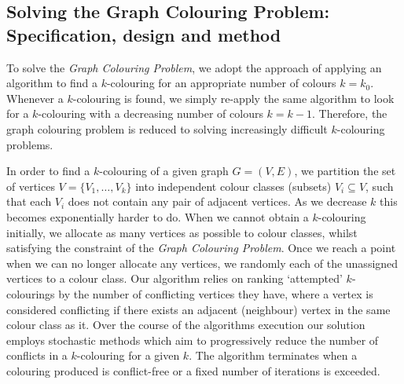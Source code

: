 \documentclass[12pt,a4paper]{article}
\begin{document}
\subsection*{Solving the Graph Colouring Problem: Specification, design and method}
\par To solve the \textit{Graph Colouring Problem}, we adopt the approach of applying an algorithm to find a $k$-colouring for an appropriate number of colours $k = k_0$. Whenever a $k$-colouring is found, we simply re-apply the same algorithm to look for a $k$-colouring with a decreasing number of colours $k=k-1$. Therefore, the graph colouring problem is reduced to solving increasingly difficult $k$-colouring problems.
\par In order to find a $k$-colouring of a given graph $G = (V, E)$, we partition the set of vertices $V = \{V_1, \dots , V_k \}$ into independent colour classes (subsets) $V_i \subseteq V$, such that each $V_i$ does not contain any pair of adjacent vertices. As we decrease $k$ this becomes exponentially harder to do. When we cannot obtain a $k$-colouring initially, we allocate as many vertices as possible to colour classes, whilst satisfying the constraint of the \textit{Graph Colouring Problem}. Once we reach a point when we can no longer allocate any vertices, we randomly each of the unassigned vertices to a colour class. Our algorithm relies on ranking `attempted' $k$-colourings by the number of conflicting vertices they have, where a vertex is considered conflicting if there exists an adjacent (neighbour) vertex in the same colour class as it. Over the course of the algorithms execution our solution employs stochastic methods which aim to progressively reduce the number of conflicts in a $k$-colouring for a given $k$. The algorithm terminates when a colouring produced is conflict-free or a fixed number of iterations is exceeded.
\end{document}
